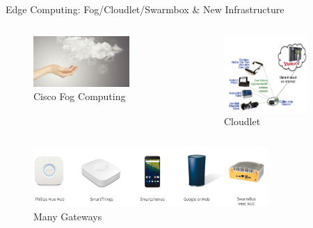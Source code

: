 \begin{frame}{Edge Computing: Fog/Cloudlet/Swarmbox \& New Infrastructure}
  \pause
  \begin{columns}
    \begin{figure}
      \includegraphics[width=0.8\textwidth]{figures/fog.png}
      \captionsetup{labelformat=empty}
      \caption{Cisco Fog Computing~\cite{bonomi2012fog}}
    \end{figure}
    \begin{figure}
      \includegraphics[width=0.8\textwidth]{figures/cloudlet.png}
      \captionsetup{labelformat=empty}
      \caption{Cloudlet~\cite{satyanarayanan2009case}}
    \end{figure}
  \end{columns}
  \pause
  \begin{figure}
    \includegraphics[width=0.8\textwidth]{figures/gateways.pdf}
    \captionsetup{labelformat=empty}
    \caption{Many Gateways}
  \end{figure}
\end{frame}

